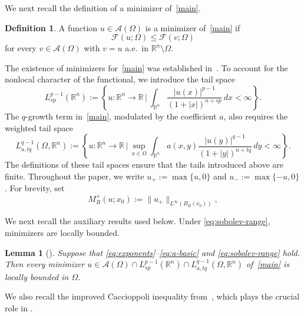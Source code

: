 \documentclass[reqno]{amsart}
\newcommand{\R}{\mathbb R}
\theoremstyle{plain}
\newtheorem{lemma}[theorem]{Lemma}
\theoremstyle{definition}
\newtheorem{definition}[theorem]{Definition}
\theoremstyle{remark}
\numberwithin{equation}{section}
\begin{document}
We next recall the definition of a minimizer of~\eqref{main}.

\begin{definition}
\label{def:minimizer}
A function \(u\in\mathcal{A}(\Omega)\) is a minimizer of~\eqref{main} if
\[
 \mathcal{F}(u;\Omega)\le\mathcal{F}(v;\Omega)
\]
for every \(v\in\mathcal{A}(\Omega)\) with \(v=u\) a.e.\ in
\(\mathbb{R}^n\setminus\Omega\).
\end{definition}

The existence of minimizers for~\eqref{main} was established
in~\cite[Section~3]{BOS22}. To account for the nonlocal character of the
functional, we introduce the tail space
\[
L^{p-1}_{sp}(\mathbb{R}^n):=\left\{u:\mathbb{R}^n\rightarrow\mathbb{R}\,\Bigg|\,\int_{\mathbb{R}^n}\frac{|u(x)|^{p-1}}{(1+|x|)^{n+sp}}\,dx<\infty\right\}.
\]
The \(q\)-growth term in~\eqref{main}, modulated by the coefficient \(a\),
also requires the weighted tail space
\[
L^{q-1}_{a,tq}(\Omega,\mathbb{R}^n):=\left\{u: \mathbb{R}^n\rightarrow\mathbb{R}\,\Bigg|\,\sup_{x\in \Omega}\int_{\mathbb{R}^n}a(x,y)\frac{|u(y)|^{q-1}}{(1+|y|)^{n+tq}}\,dy<\infty\right\}.
\]%
The definitions of these tail spaces ensure that the tails introduced above
are finite. Throughout the paper, we write
\(u_+:=\max\{u,0\}\) and \(u_-:=\max\{-u,0\}\). For brevity, set
\[
    M_R^+(u;x_0):=\|u_+\|_{L^\infty(B_R(x_0))},
\]
 

We next recall the auxiliary results used below. Under
\eqref{eq:sobolev-range}, minimizers are locally bounded.

\begin{lemma}[\cite{FKZ26}]
\label{lem2-1}
Suppose that \eqref{eq:exponents}--\eqref{eq:a-basic} and
\eqref{eq:sobolev-range} hold. Then every minimizer
\(u\in\mathcal{A}(\Omega)\cap L_{sp}^{p-1}(\R^n)
\cap L_{a,tq}^{q-1}(\Omega,\R^n)\) of~\eqref{main} is locally bounded in
\(\Omega\).
\end{lemma}

We also recall the improved Caccioppoli inequality
from~\cite[Lemma~3.2]{FKZ26}, which plays the crucial role in .
\end{document}
